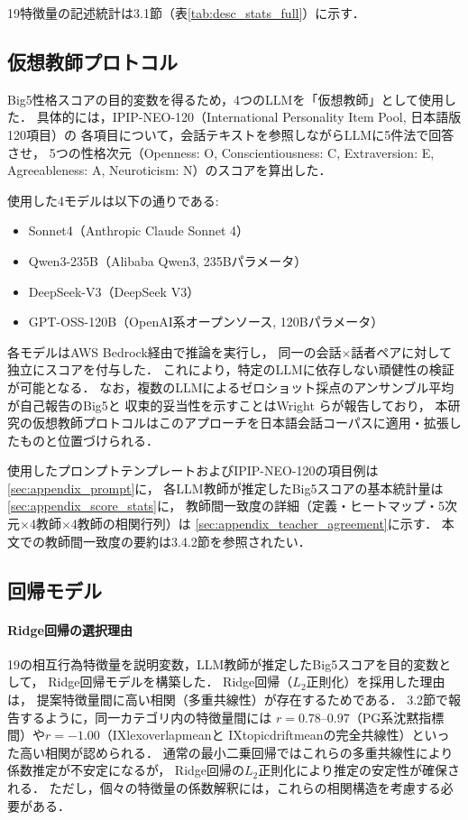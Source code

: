 \documentclass[dvipdfmx,11pt,a4paper]{bxjsarticle}
\renewcommand{\_}{\paperorigunderscore\allowbreak}%
\begin{document}
19特徴量の記述統計は3.1節（表\ref{tab:desc_stats_full}）に示す．

\subsection{仮想教師プロトコル}
\label{sec:virtual_teacher}

Big5性格スコアの目的変数を得るため，4つのLLMを「仮想教師」として使用した．
具体的には，IPIP-NEO-120（International Personality Item Pool, 日本語版120項目）の
各項目について，会話テキストを参照しながらLLMに5件法で回答させ，
5つの性格次元（Openness: O, Conscientiousness: C, Extraversion: E,
Agreeableness: A, Neuroticism: N）のスコアを算出した．

使用した4モデルは以下の通りである:
\begin{itemize}
  \item Sonnet4（Anthropic Claude Sonnet 4）
  \item Qwen3-235B（Alibaba Qwen3, 235Bパラメータ）
  \item DeepSeek-V3（DeepSeek V3）
  \item GPT-OSS-120B（OpenAI系オープンソース, 120Bパラメータ）
\end{itemize}

各モデルはAWS Bedrock経由で推論を実行し，
同一の会話$\times$話者ペアに対して独立にスコアを付与した．
これにより，特定のLLMに依存しない頑健性の検証が可能となる．
なお，複数のLLMによるゼロショット採点のアンサンブル平均が自己報告のBig5と
収束的妥当性を示すことはWright ら\cite{wright2026}が報告しており，
本研究の仮想教師プロトコルはこのアプローチを日本語会話コーパスに適用・拡張したものと位置づけられる．

使用したプロンプトテンプレートおよびIPIP-NEO-120の項目例は
\ref{sec:appendix_prompt}に，
各LLM教師が推定したBig5スコアの基本統計量は
\ref{sec:appendix_score_stats}に，
教師間一致度の詳細（定義・ヒートマップ・5次元$\times$4教師$\times$4教師の相関行列）は
\ref{sec:appendix_teacher_agreement}に示す．
本文での教師間一致度の要約は3.4.2節を参照されたい．

\subsection{回帰モデル}
\label{sec:regression}

\paragraph{Ridge回帰の選択理由}
19の相互行為特徴量を説明変数，LLM教師が推定したBig5スコアを目的変数として，
Ridge回帰モデルを構築した．
Ridge回帰（$L_2$正則化）を採用した理由は，
提案特徴量間に高い相関（多重共線性）が存在するためである．
3.2節で報告するように，同一カテゴリ内の特徴量間には
$r = 0.78$--$0.97$（PG系沈黙指標間）や$r = -1.00$（IX\_lex\_overlap\_meanと
IX\_topic\_drift\_meanの完全共線性）といった高い相関が認められる．
通常の最小二乗回帰ではこれらの多重共線性により係数推定が不安定になるが，
Ridge回帰の$L_2$正則化により推定の安定性が確保される．
ただし，個々の特徴量の係数解釈には，これらの相関構造を考慮する必要がある．
\end{document}
